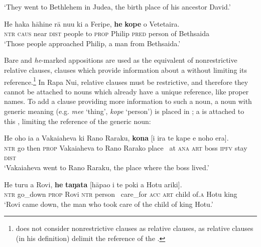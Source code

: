 \glt 
‘They went to Bethlehem in Judea, the birth place of his ancestor David.’ \textstyleExampleref{[Luk. 2:4]}
\z

\ea\label{ex:5.169}
\gll He haka hāhine rā nu{\ꞌ}u ki a Feripe, \textbf{he} \textbf{kope} o Vetetaira. \\
\textsc{ntr} \textsc{caus} near \textsc{dist} people to \textsc{prop} Philip \textsc{pred} person of Bethsaida \\

\glt 
‘Those people approached Philip, a man from Bethsaida.’ \textstyleExampleref{[John 12:21]}
\z

Bare and \textit{he}{}-marked appositions are used as the equivalent of nonrestrictive relative clauses, clauses which provide information about a  without limiting its reference.\footnote{\label{fn:276}\citet[207]{Andrews2007Relative} does not consider nonrestrictive clauses as relative clauses, as relative clauses (in his definition) delimit the reference of the .} In Rapa Nui, relative clauses must be restrictive, and therefore they cannot be attached to nouns which already have a unique reference, like proper names. To add a clause providing more information to such a noun, a noun with generic meaning (e.g. \textit{me{\ꞌ}e} ‘thing’, \textit{kope} ‘person’) is placed in ; a  is attached to this , limiting the reference of the generic noun:

\ea\label{ex:5.170}
\gll He oho ia a Vakaiaheva ki Rano Raraku, \textbf{kona} [{\ꞌ}i ira te kape  e noho era].\\
\textsc{ntr} go then \textsc{prop} Vakaiaheva to Rano Rarako place ~at \textsc{ana} \textsc{art} boss  \textsc{ipfv} stay \textsc{dist}\\

\glt 
‘Vakaiaheva went to Rano Raraku, the place where the boss lived.’ \textstyleExampleref{[R440.028]} 
\z

\ea\label{ex:5.171}
\gll He turu a Rovi, \textbf{he} \textbf{taŋata} [hāpa{\ꞌ}o i te poki {\ꞌ}a Hotu {\ꞌ}ariki]. \\
\textsc{ntr} go\_down \textsc{prop} Rovi \textsc{ntr} person ~care\_for \textsc{acc} \textsc{art} child of\textsc{.a} Hotu king \\

\glt 
‘Rovi came down, the man who took care of the child of king Hotu.’ \textstyleExampleref{[R422.002]} 
\z

